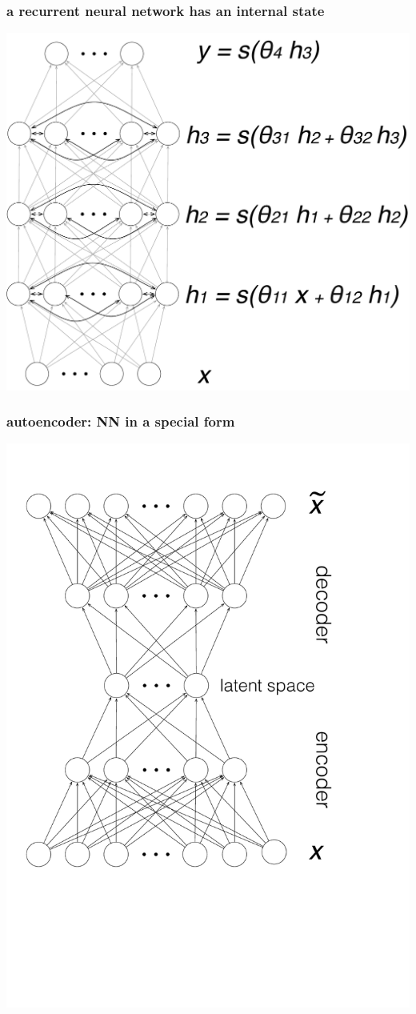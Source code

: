 \documentclass[USenglish,pdftex,compress,10pt,svgnamesi]{beamer}%
\begin{document}
\begin{frame}
\frametitle{a recurrent neural network has an internal state}
\includegraphics[scale=0.3]{nn4.pdf}
\end{frame}
\begin{frame}
\frametitle{autoencoder: NN in a special form}

\includegraphics[scale=0.3]{ae.pdf}
\end{frame}
\end{document}
